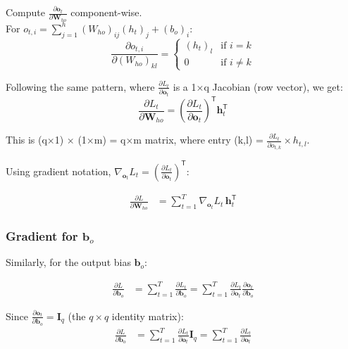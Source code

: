 \begin{notechapter}
\noindent Compute $\frac{\partial \mathbf{o}_t}{\partial \mathbf{W}_{ho}}$ component-wise.
\vspace{1em}
\\
For $o_{t,i} = \sum_{j=1}^h (W_{ho})_{ij} (h_t)_j + (b_o)_i$:
\[
\frac{\partial o_{t,i}}{\partial (W_{ho})_{kl}} = 
\begin{cases}
(h_t)_l & \text{if } i = k \\
0 & \text{if } i \neq k
\end{cases}
\]

Following the same pattern, where $\frac{\partial L_t}{\partial \mathbf{o}_t}$
is a 1×q Jacobian (row vector), we get:
\[
\frac{\partial L_t}{\partial \mathbf{W}_{ho}} = \left( \frac{\partial L_t}{\partial \mathbf{o}_t} \right)^\mathsf{T} \mathbf{h}_t^\mathsf{T}
\]

This is (q×1) × (1×m) = q×m matrix, where entry (k,l) = $\frac{\partial
L_t}{\partial o_{t,k}} \times h_{t,l}$.

Using gradient notation, $\nabla_{\mathbf{o}_t} L_t = \left(\frac{\partial
L_t}{\partial \mathbf{o}_t}\right)^\mathsf{T}$:

\begin{align}
\frac{\partial L}{\partial \mathbf{W}_{ho}} &= \sum_{t=1}^{T}
\nabla_{\mathbf{o}_t} L_t \, \mathbf{h}_t^\mathsf{T} \label{chain-rule-to-bptt:eq:dWho_detailed}
\end{align}

\subsubsection{Gradient for $\mathbf{b}_o$}

Similarly, for the output bias $\mathbf{b}_o$:

\begin{align*}
    \frac{\partial L}{\partial \mathbf{b}_o} 
    &= \sum_{t=1}^{T} \frac{\partial L_t}{\partial \mathbf{b}_o} 
= \sum_{t=1}^{T} \frac{\partial L_t}{\partial \mathbf{o}_t} \frac{\partial
\mathbf{o}_t}{\partial \mathbf{b}_o}
\end{align*}

Since $\frac{\partial \mathbf{o}_t}{\partial \mathbf{b}_o} = \mathbf{I}_q$ (the
$q \times q$ identity matrix):
\begin{align}
\frac{\partial L}{\partial \mathbf{b}_o} &= \sum_{t=1}^{T} \frac{\partial 
L_t}{\partial \mathbf{o}_t} \mathbf{I}_q
= \sum_{t=1}^{T} \frac{\partial L_t}{\partial \mathbf{o}_t}
\label{chain-rule-to-bptt:eq:dbo_jacobian}
\end{align}


\end{notechapter}
